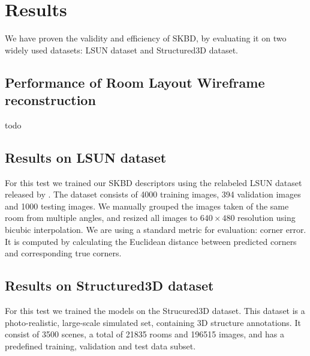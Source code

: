 \section{Results}
\label{sec:results}
We have proven the validity and efficiency of SKBD, by evaluating it on two widely used datasets: LSUN dataset\cite{zhang2015large} and Structured3D dataset\cite{zheng2020structured3d}.

\subsection{Performance of Room Layout Wireframe reconstruction}
todo

\subsection{Results on LSUN dataset}
For this test we trained our SKBD descriptors using the relabeled LSUN dataset released by \cite{ren2017coarse}. The dataset consists of 4000 training images, 394 validation images and 1000 testing images. We manually grouped the images taken of the same room from multiple angles, and resized all images to \( 640 \times 480 \) resolution using bicubic interpolation. We are using a standard metric for evaluation: corner error. It is computed by calculating the Euclidean distance between predicted corners and corresponding true corners.


\subsection{Results on Structured3D dataset}
For this test we trained the models on the Strucured3D dataset\cite{zheng2020structured3d}. This dataset is a photo-realistic, large-scale simulated set, containing 3D structure annotations. It consist of 3500 scenes, a total of 21835 rooms and 196515 images, and has a predefined training, validation and test data subset.
